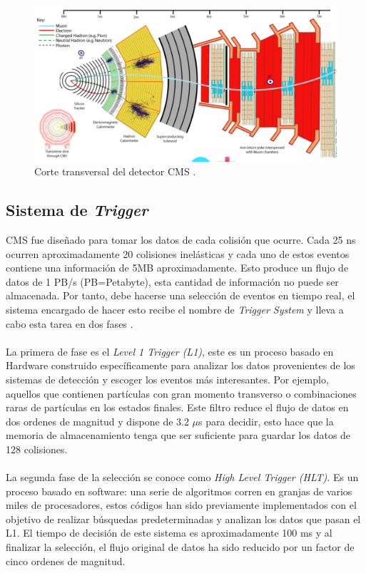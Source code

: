 \begin{figure}
\centering
\includegraphics[width=15cm]{F3.png}
\caption{\label{fig:frog} Corte transversal del detector CMS \cite{Bayatian:2006nff}.}
\end{figure}

\subsection{Sistema de \textit{Trigger}}

CMS fue diseñado para tomar los datos de cada colisión que ocurre. Cada 25 ns ocurren aproximadamente 20 colisiones inelásticas \cite{Bruning:2004ej} y cada uno de estos eventos contiene una información de 5MB aproximadamente. Esto produce un flujo de datos de 1 PB/s (PB=Petabyte), esta cantidad de información no puede ser almacenada. Por tanto, debe hacerse una selección de eventos en tiempo real, el sistema encargado de hacer esto recibe el nombre de \textit{Trigger System} y lleva a cabo esta tarea en dos fases \cite{CMSTrigger}. 
\\
\\
La primera de fase es el \textit{Level 1 Trigger (L1)}, este es un proceso basado en Hardware construido específicamente para analizar los datos provenientes de los sistemas de detección y escoger los eventos más interesantes. Por ejemplo, aquellos que contienen partículas con gran momento transverso o combinaciones raras de partículas en los estados finales. Este filtro reduce el flujo de datos en dos ordenes de magnitud y dispone de 3.2 $\mu$s para decidir, esto hace que la memoria de almacenamiento tenga que ser suficiente para guardar los datos de 128  colisiones.
\\
\\
La segunda fase de la selección se conoce como \textit{High Level Trigger (HLT)}. Es un proceso basado en software: una serie de algoritmos corren en granjas de varios miles de procesadores, estos códigos han sido previamente implementados con el objetivo de realizar búsquedas predeterminadas y analizan los datos que pasan el L1. El tiempo de decisión de este sistema es aproximadamente 100 ms y al finalizar la selección, el flujo original de datos ha sido reducido por un factor de cinco ordenes de magnitud.

